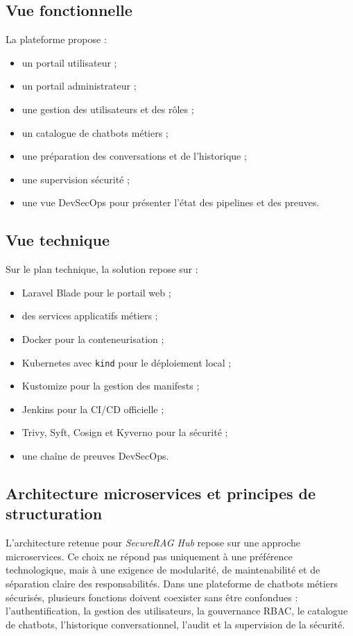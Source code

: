 \subsection{Vue fonctionnelle}

La plateforme propose :

\begin{itemize}
    \item un portail utilisateur ;
    \item un portail administrateur ;
    \item une gestion des utilisateurs et des rôles ;
    \item un catalogue de chatbots métiers ;
    \item une préparation des conversations et de l’historique ;
    \item une supervision sécurité ;
    \item une vue DevSecOps pour présenter l’état des pipelines et des preuves.
\end{itemize}

\subsection{Vue technique}

Sur le plan technique, la solution repose sur :

\begin{itemize}
    \item Laravel Blade pour le portail web ;
    \item des services applicatifs métiers ;
    \item Docker pour la conteneurisation ;
    \item Kubernetes avec \texttt{kind} pour le déploiement local ;
    \item Kustomize pour la gestion des manifests ;
    \item Jenkins pour la CI/CD officielle ;
    \item Trivy, Syft, Cosign et Kyverno pour la sécurité ;
    \item une chaîne de preuves DevSecOps.
\end{itemize}

\subsection{Architecture microservices et principes de structuration}

L’architecture retenue pour \textit{SecureRAG Hub} repose sur une approche microservices. Ce choix ne répond pas uniquement à une préférence technologique, mais à une exigence de modularité, de maintenabilité et de séparation claire des responsabilités. Dans une plateforme de chatbots métiers sécurisés, plusieurs fonctions doivent coexister sans être confondues : l’authentification, la gestion des utilisateurs, la gouvernance RBAC, le catalogue de chatbots, l’historique conversationnel, l’audit et la supervision de la sécurité.

